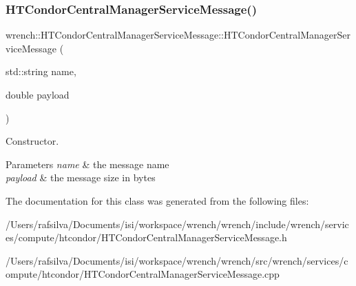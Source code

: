 \subsubsection{\texorpdfstring{H\+T\+Condor\+Central\+Manager\+Service\+Message()}{HTCondorCentralManagerServiceMessage()}}
{\footnotesize\ttfamily wrench\+::\+H\+T\+Condor\+Central\+Manager\+Service\+Message\+::\+H\+T\+Condor\+Central\+Manager\+Service\+Message (\begin{DoxyParamCaption}\item[{std\+::string}]{name,  }\item[{double}]{payload }\end{DoxyParamCaption})\hspace{0.3cm}{\ttfamily [protected]}}



Constructor. 


\begin{DoxyParams}{Parameters}
{\em name} & the message name \\
\hline
{\em payload} & the message size in bytes \\
\hline
\end{DoxyParams}


The documentation for this class was generated from the following files\+:\begin{DoxyCompactItemize}
\item 
/\+Users/rafsilva/\+Documents/isi/workspace/wrench/wrench/include/wrench/services/compute/htcondor/H\+T\+Condor\+Central\+Manager\+Service\+Message.\+h\item 
/\+Users/rafsilva/\+Documents/isi/workspace/wrench/wrench/src/wrench/services/compute/htcondor/H\+T\+Condor\+Central\+Manager\+Service\+Message.\+cpp\end{DoxyCompactItemize}
